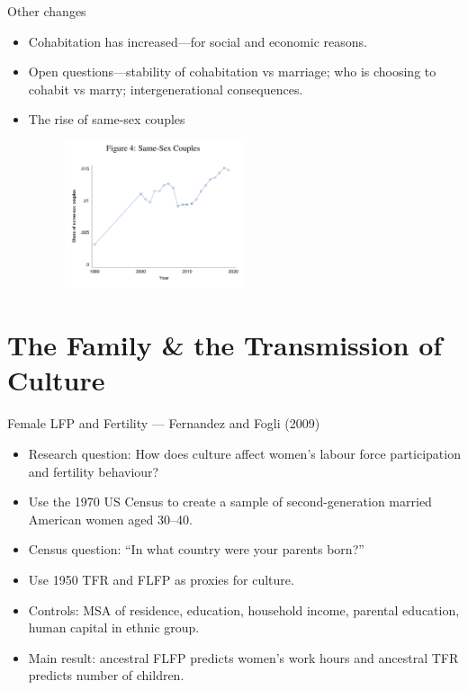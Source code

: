 \documentclass[11pt,notes=hide,aspectratio=169,mathserif]{beamer}
\begin{document}
\begin{frame}{Other changes}
\begin{itemize}
  \item Cohabitation has increased—for social and economic reasons.
  \item Open questions—stability of cohabitation vs marriage; who is choosing to cohabit vs marry; intergenerational consequences.
  \item The rise of same-sex couples
  \begin{figure}
    \centering
    \includegraphics[width=0.5\textwidth]{same_sex.png}
  \end{figure}
\end{itemize}
\end{frame}

\section{The Family \& the Transmission of Culture}
\begin{frame}{Female LFP and Fertility — Fernandez and Fogli (2009)}
\begin{itemize}
  \item Research question: How does culture affect women's labour force participation and fertility behaviour?
  \item Use the 1970 US Census to create a sample of second-generation married American women aged 30--40.
  \item Census question: “In what country were your parents born?”
  \item Use 1950 TFR and FLFP as proxies for culture.
  \item Controls: MSA of residence, education, household income, parental education, human capital in ethnic group.
  \item Main result: ancestral FLFP predicts women’s work hours and ancestral TFR predicts number of children.
\end{itemize}
\end{frame}
\end{document}
